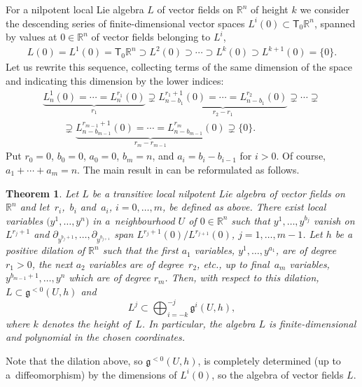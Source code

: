 \documentclass[11pt]{article}
\numberwithin{equation}{section}
\numberwithin{equation}{section}
\newtheorem{Theorem}{Theorem}[section]
\begin{document}
For a nilpotent local Lie algebra $L$ of vector fields on ${\mathbb R}^n$ of height $k$ we consider the descending series of finite-dimensional vector spaces $L^i(0)\subset{\mathsf T}_0{\mathbb R}^n$, spanned by values at $0\in{\mathbb R}^n$ of vector fields belonging to $L^i$,
\begin{gather*}%
L(0)=L^1(0)={\mathsf T}_0{\mathbb R}^n\supset L^2(0)\supset \cdots\supset L^{k}(0)\supset L^{k+1}(0)=\{ 0\} .
\end{gather*}
Let us rewrite this sequence, collecting terms of the same dimension of the space and indicating this dimension by the lower indices:
\begin{gather*}
 \underbrace{L^1_n(0)=\cdots= L^{r_1}_n(0)}_{r_1}\supsetneq
\underbrace{L^{r_1+1}_{n-b_1}(0)=\cdots= L^{r_2}_{n-b_1}(0)}_{r_2-r_1}\supsetneq
\cdots\supsetneq\\
\qquad{} \supsetneq\underbrace{L^{r_{m-1}+1}_{n-b_{m-1}}(0)=\cdots= L^{r_m}_{n-b_{m-1}}(0)}_{r_m-r_{m-1}}
\supsetneq \{ 0\} .
\end{gather*}
Put $r_0=0$, $b_0=0$, $a_0=0$, $b_m=n$, and $a_i=b_i-b_{i-1}$ for $i>0$. Of course, $a_1+\cdots+a_m=n$.
The main result in \cite{JG90} can be reformulated as follows.
\begin{Theorem}\label{nil}
Let $L$ be a transitive local nilpotent Lie algebra of vector fields on ${\mathbb R}^n$ and let~$r_i$,~$b_i$ and~$a_i$, $i=0,\dots,m$, be defined as above. There exist local variables $\big(y^1,\dots,y^n\big)$ in a~neighbourhood $U$ of $0\in{\mathbb R}^n$ such that $y^1,\dots, y^{b_j}$ vanish on $L^{r_j+1}$ and $\partial_{y^{b_j+1}},\dots,\partial_{y^{b_{j+1}}}$ span $L^{r_{j}+1}(0)/L^{r_{j+1}}(0)$, $j=1,\dots,m-1$. Let $h$ be a positive dilation of ${\mathbb R}^n$ such that the first $a_1$ variables, $y^1,\dots,y^{a_1}$, are of degree $r_1>0$, the next $a_2$ variables are of degree~$r_2$, etc., up to final~$a_m$ variables, $y^{b_{m-1}+1},\dots,y^n$ which are of degree $r_{m}$.
Then, with respect to this dilation, $L\subset\mathfrak{g}^{<0}(U,h)$ and
\[ L^j\subset \bigoplus_{i=-k}^{-j}\mathfrak{g}^i(U,h) ,\]
where $k$ denotes the height of~$L$.
In particular, the algebra $L$ is finite-dimensional and polynomial in the chosen coordinates.
\end{Theorem}
\begin{Remark}
Note that the dilation above, so $\mathfrak{g}^{<0}(U,h)$, is completely determined (up to a~diffeomorphism) by the dimensions of $L^i(0)$, so the algebra of vector fields $L$.
\end{Remark}
\end{document}
